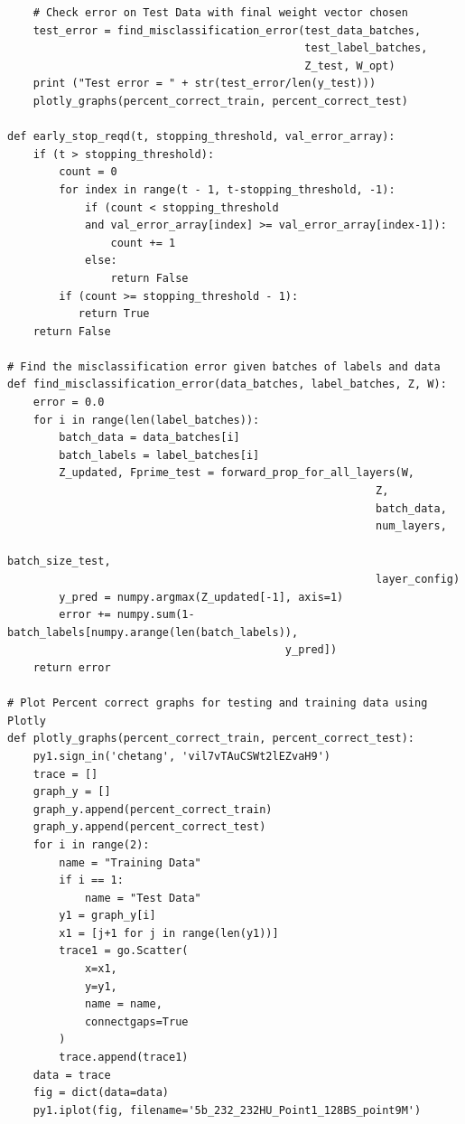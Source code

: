\documentclass{article}
\begin{document}
\begin{lstlisting}
    # Check error on Test Data with final weight vector chosen
    test_error = find_misclassification_error(test_data_batches, 
                                              test_label_batches, 
                                              Z_test, W_opt)
    print ("Test error = " + str(test_error/len(y_test)))
    plotly_graphs(percent_correct_train, percent_correct_test)
    
def early_stop_reqd(t, stopping_threshold, val_error_array):
    if (t > stopping_threshold):
        count = 0
        for index in range(t - 1, t-stopping_threshold, -1):
            if (count < stopping_threshold 
            and val_error_array[index] >= val_error_array[index-1]):
                count += 1
            else:
                return False
        if (count >= stopping_threshold - 1):
           return True
    return False
        
# Find the misclassification error given batches of labels and data
def find_misclassification_error(data_batches, label_batches, Z, W):
    error = 0.0
    for i in range(len(label_batches)):
        batch_data = data_batches[i]
        batch_labels = label_batches[i]
        Z_updated, Fprime_test = forward_prop_for_all_layers(W, 
                                                         Z, 
                                                         batch_data,
                                                         num_layers, 
                                                         batch_size_test, 
                                                         layer_config)
        y_pred = numpy.argmax(Z_updated[-1], axis=1)
        error += numpy.sum(1-batch_labels[numpy.arange(len(batch_labels)), 
                                           y_pred])    
    return error
                                           
# Plot Percent correct graphs for testing and training data using Plotly
def plotly_graphs(percent_correct_train, percent_correct_test):
    py1.sign_in('chetang', 'vil7vTAuCSWt2lEZvaH9')
    trace = []
    graph_y = []
    graph_y.append(percent_correct_train)
    graph_y.append(percent_correct_test)
    for i in range(2):
        name = "Training Data"
        if i == 1:
            name = "Test Data"
        y1 = graph_y[i]
        x1 = [j+1 for j in range(len(y1))]
        trace1 = go.Scatter(
            x=x1,
            y=y1,
            name = name,
            connectgaps=True
        )
        trace.append(trace1)
    data = trace
    fig = dict(data=data)
    py1.iplot(fig, filename='5b_232_232HU_Point1_128BS_point9M')
        

\end{lstlisting}
\end{document}
